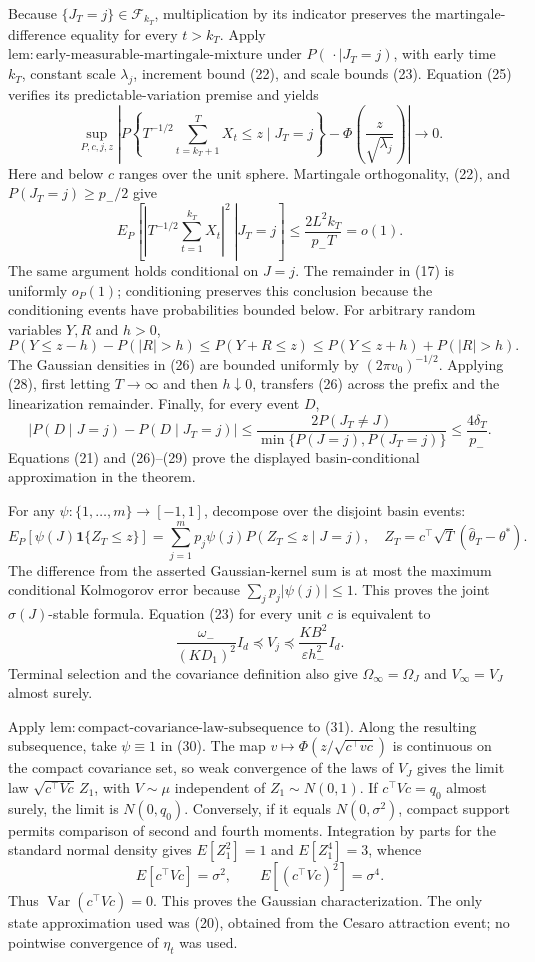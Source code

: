 Because \(\{J_T=j\}\in\mathcal F_{k_T}\), multiplication by its indicator
preserves the martingale-difference equality for every \(t>k_T\).  Apply
\(\mathrm{lem:early\text{-}measurable\text{-}martingale\text{-}mixture}\)
under \(P(\,\cdot\mid J_T=j)\), with early time \(k_T\), constant scale
\(\lambda_j\), increment bound (22), and scale bounds (23).  Equation (25)
verifies its predictable-variation premise and yields
\[
 \sup_{P,c,j,z}\left|P\!\left\{T^{-1/2}\sum_{t=k_T+1}^TX_t\le z
 \mid J_T=j\right\}
 -\Phi\!\left(\frac z{\sqrt{\lambda_j}}\right)\right|\longrightarrow0.
\tag{26}
\]
Here and below \(c\) ranges over the unit sphere.  Martingale orthogonality,
(22), and \(P(J_T=j)\ge p_-/2\) give
\[
 E_P\!\left[\left.\left|T^{-1/2}\sum_{t=1}^{k_T}X_t\right|^2
 \ \right|J_T=j\right]
 \le\frac{2L^2k_T}{p_-T}=o(1).
\tag{27}
\]
The same argument holds conditional on \(J=j\).  The remainder in (17) is
uniformly \(o_P(1)\); conditioning preserves this conclusion because the
conditioning events have probabilities bounded below.  For arbitrary
random variables \(Y,R\) and \(h>0\),
\[
 P(Y\le z-h)-P(|R|>h)\le P(Y+R\le z)
 \le P(Y\le z+h)+P(|R|>h).
\tag{28}
\]
The Gaussian densities in (26) are bounded uniformly by
\((2\pi v_0)^{-1/2}\).  Applying (28), first letting \(T\to\infty\) and then
\(h\downarrow0\), transfers (26) across the prefix and the linearization
remainder.  Finally, for every event \(D\),
\[
 \left|P(D\mid J=j)-P(D\mid J_T=j)\right|
 \le\frac{2P(J_T\ne J)}{\min\{P(J=j),P(J_T=j)\}}
 \le\frac{4\delta_T}{p_-}.
\tag{29}
\]
Equations (21) and (26)--(29) prove the displayed basin-conditional
approximation in the theorem.

For any \(\psi:\{1,\ldots,m\}\to[-1,1]\), decompose over the disjoint basin
events:
\[
 E_P[\psi(J)\mathbf1\{Z_T\le z\}]
 =\sum_{j=1}^mp_j\psi(j)P(Z_T\le z\mid J=j),
 \quad Z_T=c^\top\sqrt T(\widehat\theta_T-\theta^*).
\tag{30}
\]
The difference from the asserted Gaussian-kernel sum is at most the maximum
conditional Kolmogorov error because \(\sum_jp_j|\psi(j)|\le1\).  This proves
the joint \(\sigma(J)\)-stable formula.  Equation (23) for every unit \(c\)
is equivalent to
\[
 \frac{\omega_-}{(KD_1)^2}I_d\preceq V_j
 \preceq\frac{KB^2}{\varepsilon h_-^2}I_d.
\tag{31}
\]
Terminal selection and the covariance definition also give
\(\Omega_\infty=\Omega_J\) and \(V_\infty=V_J\) almost surely.

Apply \(\mathrm{lem:compact\text{-}covariance\text{-}law\text{-}subsequence}\)
to (31).  Along the resulting subsequence, take \(\psi\equiv1\) in (30).
The map \(v\mapsto\Phi(z/\sqrt{c^\top vc})\) is continuous on the compact
covariance set, so weak convergence of the laws of \(V_J\) gives the limit
law \(\sqrt{c^\top Vc}\,Z_1\), with \(V\sim\mu\) independent of
\(Z_1\sim N(0,1)\).  If \(c^\top Vc=q_0\) almost surely, the limit is
\(N(0,q_0)\).  Conversely, if it equals \(N(0,\sigma^2)\), compact support
permits comparison of second and fourth moments.  Integration by parts for
the standard normal density gives \(E[Z_1^2]=1\) and \(E[Z_1^4]=3\), whence
\[
 E[c^\top Vc]=\sigma^2,
 \qquad E[(c^\top Vc)^2]=\sigma^4.
\tag{32}
\]
Thus \(\operatorname{Var}(c^\top Vc)=0\).  This proves the Gaussian
characterization.  The only state approximation used was (20), obtained
from the Cesaro attraction event; no pointwise convergence of \(\eta_t\)
was used.
